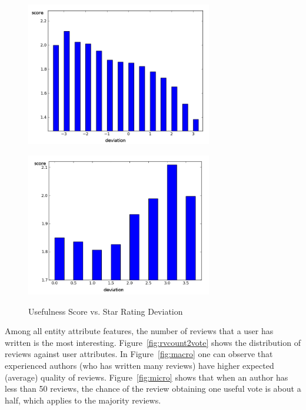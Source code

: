 \documentclass[a4paper,12pt,title]{article}
\begin{document}
\begin{figure}
\begin{minipage}[t]{0.5\linewidth}
\centering
\includegraphics[width=230pt]{graph/starsdeviation.png}
\label{fig:signed}
\end{minipage}
\begin{minipage}[t]{0.5\linewidth}
\centering
\includegraphics[width=230pt]{graph/abs_starsdeviation.png}
\label{fig:unsigned}
\end{minipage}
\caption{Usefulness Score vs. Star Rating Deviation}
\label{fig:deviation2score}
\end{figure}

 Among all entity attribute features, the number of reviews that a user has written is the most interesting. Figure~\ref{fig:rvcount2vote} shows the distribution of reviews against user attributes. In Figure~\ref{fig:macro} one can observe that experienced authors (who has written many reviews) have higher expected (average) quality of reviews. Figure~\ref{fig:micro} shows that when an author has less than 50 reviews, the chance of the review obtaining one useful vote is about a half, which applies to the majority reviews.
\end{document}
